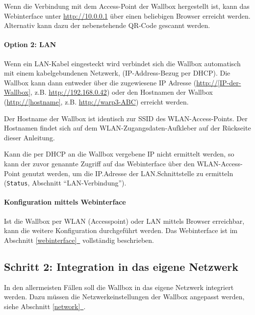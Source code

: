 \documentclass[a4paper,10pt]{article}
\newcommand*{\fullref}[1]{Abschnitt \hyperref[{#1}]{\ref*{#1}~\nameref*{#1}}}
\begin{document}
\begin{multicols*}{2}
    \begin{minipage}{0.35\textwidth}
        Wenn die Verbindung mit dem Access-Point der Wallbox hergestellt ist, kann das Webinterface
        unter \url{http://10.0.0.1} über einen beliebigen Browser erreicht werden.
        Alternativ kann dazu der nebenstehende QR-Code gescannt werden.
    \end{minipage}\hfill
    \begin{minipage}{0.12\textwidth}
        \begin{flushright}
        \end{flushright}
    \end{minipage}

    \paragraph{Option 2: LAN}
    Wenn ein LAN-Kabel eingesteckt wird verbindet sich die
    Wallbox automatisch mit einem
    kabelgebundenen Netzwerk, (IP-Address-Bezug
    per DHCP). Die Wallbox kann dann entweder über die zugewiesene IP
    Adresse (\url{http://[IP-der-Wallbox]}, z.B. \url{http://192.168.0.42})
    oder den Hostnamen der Wallbox (\url{http://[hostname]}, z.B.
    \url{http://warp3-ABC}) erreicht werden.

    Der Hostname der Wallbox ist identisch zur SSID des WLAN-Access-Points. Der Hostnamen findet sich
    auf dem WLAN-Zugangsdaten-Aufkleber auf der Rückseite dieser Anleitung.

    Kann die per DHCP an die Wallbox vergebene IP nicht ermittelt werden, so kann der
    zuvor genannte Zugriff auf das Webinterface über den WLAN-Access-Point genutzt
    werden, um die IP.Adresse der LAN.Schnittstelle zu ermitteln (\texttt{Status},
    Abschnitt \enquote{LAN-Verbindung}).

    \paragraph{Konfiguration mittels Webinterface}
    Ist die Wallbox per WLAN (Accesspoint) oder LAN mittels Browser erreichbar,
    kann die weitere Konfiguration durchgeführt werden.
    Das Webinterface ist im \fullref{webinterface} vollständig beschrieben.

    \subsection{Schritt 2: Integration in das eigene Netzwerk}
    In den allermeisten Fällen soll die Wallbox in das eigene Netzwerk
    integriert werden. Dazu müssen die Netzwerkeinstellungen der Wallbox
    angepasst werden, siehe \fullref{network}.


\end{multicols*}
\end{document}
